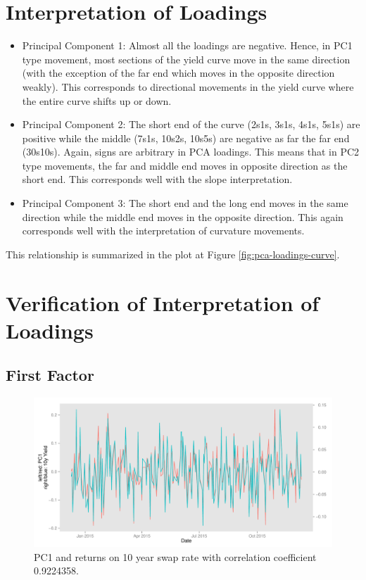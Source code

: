 \documentclass[11pt]{scrreprt}
\begin{document}
\section{Interpretation of Loadings}

\begin{itemize}
\item Principal Component 1: Almost all the loadings are negative. Hence, in PC1 type movement, most sections of the yield curve move in the same direction (with the exception of the far end which moves in the opposite direction weakly). This corresponds to directional movements in the yield curve where the entire curve shifts up or down.
\item Principal Component 2: The short end of the curve (2s1s, 3s1s, 4s1s, 5s1s) are positive while the middle (7s1s, 10s2s, 10s5s) are negative as far the far end (30s10s). Again, signs are arbitrary in PCA loadings. This means that in PC2 type movements, the far and middle end moves in opposite direction as the short end. This corresponds well with the slope interpretation.
\item Principal Component 3: The short end and the long end moves in the same direction while the middle end moves in the opposite direction. This again corresponds well with the interpretation of curvature movements.
\end{itemize}

This relationship is summarized in the plot at Figure \ref{fig:pca-loadings-curve}.

\section{Verification of Interpretation of Loadings}

\subsection{First Factor}

\begin{figure}[H]
\centering\includegraphics[width=\textwidth]{verify-first.pdf}
\caption{PC1 and returns on 10 year swap rate with correlation coefficient 0.9224358.}
\label{fig:verify-first}
\end{figure}
\end{document}
